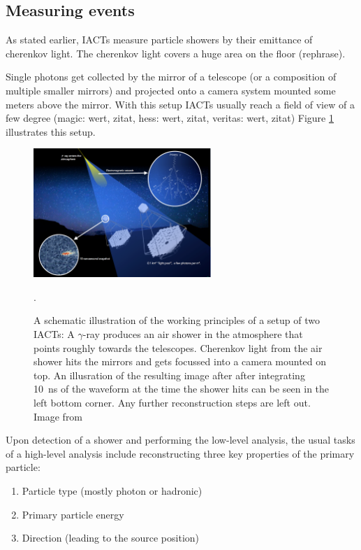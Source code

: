 \subsection{Measuring events}
As stated earlier, IACTs measure particle showers by their emittance of cherenkov 
light. The cherenkov light covers a huge area on the floor (rephrase).

Single photons get collected by the mirror of a telescope (or a composition of 
multiple smaller mirrors) and projected onto a camera system mounted some 
meters above the mirror.
With this setup IACTs usually reach a field of view of 
a few degree (magic: wert, zitat, hess: wert, zitat, veritas: wert, zitat)
Figure \ref{fig:iact_mirror_camera} illustrates this 
setup.


\begin{figure}
	\centering
	\includegraphics[width=0.6\textwidth]{images/cta47.png}
	\caption{A schematic illustration of the working principles of 
	a setup of two IACTs:
	A $\gamma$-ray produces an air shower in the atmosphere
	that points roughly towards the telescopes.
	Cherenkov light from the air shower 
	hits the mirrors and gets focussed into a camera mounted on top.
	An illusration of the resulting image after after integrating 
	\SI{10}{\nano\second} of the waveform at the time the shower hits
	can be seen in the left bottom corner.
	Any further reconstruction steps are left out.
	Image from \cite{cta_web}}.
	\label{fig:iact_mirror_camera}
\end{figure}


Upon detection of a shower and performing the low-level analysis,
the usual tasks of a high-level analysis include reconstructing 
three key properties of the primary particle:
\begin{enumerate}
	\item{Particle type (mostly photon or hadronic)}
	\item{Primary particle energy}
	\item{Direction (leading to the source position)}
\end{enumerate}

